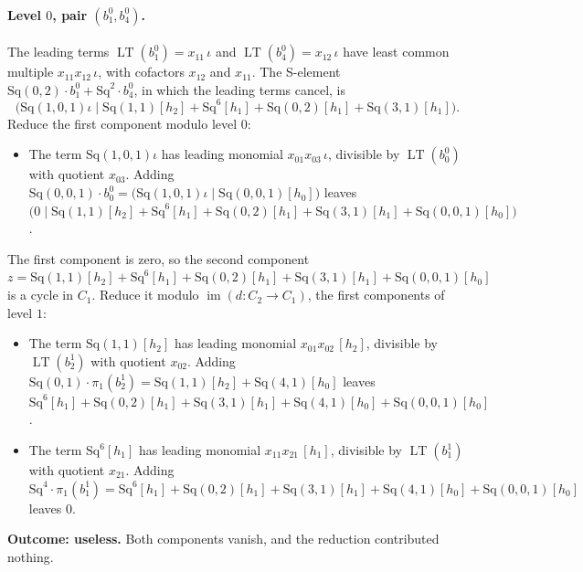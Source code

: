 \documentclass[11pt]{article}
\newcommand{\Sq}{\mathrm{Sq}}
\DeclareMathOperator{\LT}{LT}
\begin{document}
\paragraph{Level $0$, pair $(b^{0}_{1}, b^{0}_{4})$.} The leading terms $\LT(b^{0}_{1}) = x_{11}\,\iota$ and $\LT(b^{0}_{4}) = x_{12}\,\iota$ have least common multiple $x_{11}x_{12}\,\iota$, with cofactors $x_{12}$ and $x_{11}$. The S-element $\Sq(0,2)\cdot b^{0}_{1} + \Sq^{2}\cdot b^{0}_{4}$, in which the leading terms cancel, is
\[\bigl(\Sq(1,0,1)\iota \;\big|\; \Sq(1,1)[h_2] + \Sq^{6}[h_1] + \Sq(0,2)[h_1] + \Sq(3,1)[h_1]\bigr).\]
Reduce the first component modulo level $0$:
\begin{itemize}
\item The term $\Sq(1,0,1)\iota$ has leading monomial $x_{01}x_{03}\,\iota$, divisible by $\LT(b^{0}_{0})$ with quotient $x_{03}$. Adding $\Sq(0,0,1)\cdot b^{0}_{0} = \bigl(\Sq(1,0,1)\iota \;\big|\; \Sq(0,0,1)[h_0]\bigr)$ leaves $\bigl(0 \;\big|\; \Sq(1,1)[h_2] + \Sq^{6}[h_1] + \Sq(0,2)[h_1] + \Sq(3,1)[h_1] + \Sq(0,0,1)[h_0]\bigr)$.
\end{itemize}
The first component is zero, so the second component $z = \Sq(1,1)[h_2] + \Sq^{6}[h_1] + \Sq(0,2)[h_1] + \Sq(3,1)[h_1] + \Sq(0,0,1)[h_0]$ is a cycle in $C_{1}$.
Reduce it modulo $\operatorname{im}(d\colon C_{2}\to C_{1})$, the first components of level $1$:
\begin{itemize}
\item The term $\Sq(1,1)[h_2]$ has leading monomial $x_{01}x_{02}\,[h_2]$, divisible by $\LT(b^{1}_{2})$ with quotient $x_{02}$. Adding $\Sq(0,1)\cdot \pi_1(b^{1}_{2}) = \Sq(1,1)[h_2] + \Sq(4,1)[h_0]$ leaves $\Sq^{6}[h_1] + \Sq(0,2)[h_1] + \Sq(3,1)[h_1] + \Sq(4,1)[h_0] + \Sq(0,0,1)[h_0]$.
\item The term $\Sq^{6}[h_1]$ has leading monomial $x_{11}x_{21}\,[h_1]$, divisible by $\LT(b^{1}_{1})$ with quotient $x_{21}$. Adding $\Sq^{4}\cdot \pi_1(b^{1}_{1}) = \Sq^{6}[h_1] + \Sq(0,2)[h_1] + \Sq(3,1)[h_1] + \Sq(4,1)[h_0] + \Sq(0,0,1)[h_0]$ leaves $0$.
\end{itemize}
\textbf{Outcome: useless.} Both components vanish, and the reduction contributed nothing.
\medskip
\end{document}
